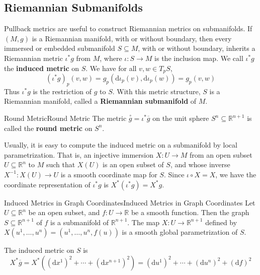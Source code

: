 \documentclass[../main.tex]{subfiles}
\begin{document}
\subsection{Riemannian Submanifolds}
Pullback metrics are useful to construct Riemannian metrics on submanifolds. If $(M,g)$ is a Riemannian manifold, with or without boundary, then every immersed or embedded submanifold $S \subseteq M$, with or without boundary, inherits a Riemannian metric $\iota^*g$ from $M$, where $\iota:S\to M$ is the inclusion map. We call $\iota^*g$ the \textbf{induced metric} on $S$. We have for all $v,w \in T_pS$,
\begin{equation*}
  (\iota^*g)_p (v,w) = g_p(\mathrm{d} \iota_p(v), \mathrm{d}\iota_p(w)) = g_p(v,w)
\end{equation*}
Thus $\iota^*g$ is the restriction of $g$ to $S$. With this metric structure, $S$ is a Riemannian manifold, called a \textbf{Riemannian submanifold} of $M$.

\begin{example}{Round Metric}{Round Metric}
  The metric $\overset{\circ}{g} = \iota^*\overline{g}$ on the unit sphere $S^n \subseteq \mathbb{R}^{n+1}$ is called the \textbf{round metric} on $S^n$.
\end{example}

Usually, it is easy to compute the induced metric on a submanifold by local parametrization. That is, an injective immersion $X:U\to M$ from an open subset $U\subseteq \mathbb{R}^n$ to $M$ such that $X(U)$ is an open subset of $S$, and whose inverse $X^{-1}:X(U)\to U$ is a smooth coordinate map for $S$. Since $\iota \circ X = X$, we have the coordinate representation of $\iota^*g$ is $X^*(\iota^*g) = X^*g$.

\begin{example}{Induced Metrics in Graph Coordinates}{Induced Metrics in Graph Coordinates}
  Let $U \subseteq \mathbb{R}^n$ be an open subset, and $f:U\to \mathbb{R}$ be a smooth function. Then the graph $S \subseteq \mathbb{R}^{n+1}$ of $f$ is a submanifold of $\mathbb{R}^{n+1}$. The map $X:U\to \mathbb{R}^{n+1}$ defined by $X(u^1, \ldots, u^n) = (u^1, \ldots, u^n, f(u))$ is a smooth global parametrization of $S$.

  The induced metric on $S$ is
  \begin{equation*}
    X^* \overline{g} = X^*((\mathrm{d} x^1)^2 + \cdots + (\mathrm{d} x^{n+1})^2) = (\mathrm{d} u^1)^2 + \cdots + (\mathrm{d} u^n)^2 + (\mathrm{d} f)^2
  \end{equation*}
\end{example}
\end{document}
